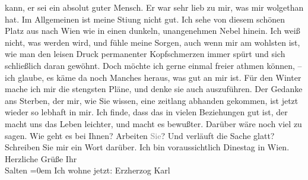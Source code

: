 \begin{ledgroupsized}[t]{13cm}
               kann, er sei ein absolut guter Mensch. Er war sehr lieb zu mir, was mir wolgethan
               hat. Im Allgemeinen ist meine Sti{\geminationm}ung nicht gut. Ich
               sehe von diesem schönen Platz aus nach Wien wie in
               einen dunkeln, unangenehmen Nebel hinein. Ich weiß nicht, was werden wird, und fühle
               meine Sorgen, auch wenn mir am wohlsten ist, wie man den leisen Druck permanenter
               Kopfschmerzen immer spürt und sich schließlich daran gewöhnt. Doch möchte ich gerne
               einmal freier athmen können, – ich glaube, {\pb}es käme da noch Manches
               heraus, was gut an mir ist. Für den Winter mache ich mir die stengsten Pläne, und
               denke sie auch auszuführen. Der Gedanke ans Sterben, der mir, wie Sie wissen, eine
               zeitlang abhanden gekommen, ist jetzt wieder so lebhaft in mir. Ich finde, dass das
               in vielen Beziehungen gut ist, der macht uns das Leben leichter, und macht es
               bewußter. Darüber wäre noch viel zu sagen.\pend
           \pstart
           Wie geht es bei Ihnen? Arbeiten \textcolor{gray}{Sie}? Und verläuft die Sache glatt?
               Schreiben Sie mir ein Wort darüber. Ich bin voraussichtlich Dinestag in Wien. Herzliche Grüße\pend
           \pstart
           Ihr{\\[\baselineskip]}\spacefill\mbox{Salten}\pend
           \leftskip=0em{}\pstart
           \noindent{}Ich wohne jetzt: Erzherzog Karl\pend
           
         
         \endnumbering{}\end{ledgroupsized}\begin{anhang}\end{anhang}\newcommand{\dateiname}{L03274}\newcommand{\titel}{Felix Salten an Arthur Schnitzler, 3. 9. [1897]}\newcommand{\editorInnen}{Martin Anton Müller und Laura Untner}
      